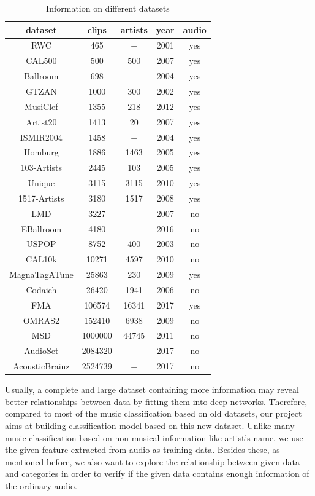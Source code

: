 \documentclass{article}
\begin{document}
\begin{table}[h!]
\centering
\begin{tabular}{*{5}{c}} \hline
dataset & clips & artists & year & audio \\ \hline
RWC & 465 & $-$ & 2001 & yes \\
CAL500 & 500 & 500 & 2007 & yes \\
Ballroom&  698& $-$ & 2004 & yes \\
GTZAN&  1000& 300 & 2002 & yes \\
MusiClef&  1355&  218 & 2012 & yes \\
Artist20&  1413& 20 &  2007&  yes \\
ISMIR2004&  1458 &  $-$ & 2004 & yes  \\
Homburg& 1886 & 1463 & 2005 & yes \\
103-Artists & 2445 & 103 & 2005 & yes \\  
Unique& 3115 & 3115 & 2010 & yes \\
1517-Artists& 3180 & 1517 & 2008 & yes \\
LMD& 3227 & $-$ & 2007 & no \\
EBallroom& 4180 & $-$ & 2016 & no\\ 
USPOP&8752  & 400 & 2003 & no \\
CAL10k& 10271 & 4597 & 2010 & no \\
MagnaTagATune& 25863 & 230 & 2009 & yes \\
Codaich& 26420 & 1941 & 2006 & no \\
FMA& 106574 & 16341 & 2017 & yes \\
OMRAS2 & 152410 & 6938 & 2009 & no \\
MSD& 1000000 & 44745 & 2011 & no \\
AudioSet& 2084320 & $-$ & 2017 & no \\
AcousticBrainz& 2524739 & $-$ & 2017 & no \\ 
\end{tabular}
\caption{Information on different datasets \citep{fma}}
\label{table:1}
\end{table}

Usually, a complete and large dataset containing more information may reveal better relationships between data by fitting them into deep networks. Therefore, compared to most of the music classification based on old datasets, our project aims at building classification model based on this new dataset. Unlike many music classification based on non-musical information like artist's name, we use the given feature extracted from audio as training data. Besides these, as mentioned before, we also want to explore the relationship between given data and categories in order to verify if the given data contains enough information of the ordinary audio. 
\end{document}
